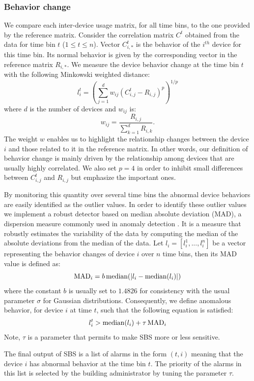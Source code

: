 \subsubsection{Behavior change}
We compare each inter-device usage matrix, for all time bins, to the one provided by the reference matrix.  
Consider the correlation matrix $C^t$ obtained from the data for time bin $t$ ($1 \leq t \leq n$).  
Vector $C^t_{i,*}$ is the behavior of the $i^{th}$ device for this time bin.
Its normal behavior is given by the corresponding vector in the reference matrix $R_{i,*}$.
We measure the device behavior change at the time bin $t$ with the following Minkowski weighted distance:
\[ l^t_{i} = \left(\sum_{j=1}^d  w_{ij}\left(C^t_{i,j} - R_{i,j}\right)^p\right)^{1/p} \]
where $d$ is the number of devices and $w_{ij}$ is:
\[ w_{ij} = \frac{R_{i,j}}{\sum_{k=1}^d R_{i,k}}. \]
The weight $w$ enables us to highlight the relationship changes between the device $i$ and those related to it in the reference matrix.
In other words, our definition of behavior change is mainly driven by the relationship among devices that are usually highly correlated.
We also set $p=4$ in order to inhibit small differences between $C^t_{i,j}$ and $R_{i,j}$ but emphasize the important ones.

By monitoring this quantity over several time bins the abnormal device behaviors are easily identified as the outlier values.
In order to identify these outlier values we implement a robust detector based on median absolute deviation (MAD), a dispersion measure commonly used in anomaly detection \cite{huber:wiley2009,chan:springer2005}.
It is a measure that robustly estimates the variability of the data by computing the median of the absolute deviations from the median of the data.
 Let $l_{i} = [l_i^1,...,l_i^n]$ be a vector representing the behavior changes of device $i$ over $n$ time bins, then its MAD value is defined as:
\[ \operatorname{MAD}_i = b \operatorname{median}(\lvert l_{i} - \operatorname{median}(l_{i})\rvert)\]
where the constant $b$ is usually set to $1.4826$ for consistency with the usual parameter $\sigma$ for Gaussian distributions.
Consequently, we define anomalous behavior, for device $i$ at time $t$, such that the following equation is satisfied:%
\[l^t_{i} > \operatorname{median}(l_{i}) + \tau  \operatorname{MAD}_i\]
Note, $\tau$ is a parameter that permits to make SBS more or less sensitive.

The final output of SBS is a list of alarms in the form $(t,i)$ meaning that the device $i$ has abnormal behavior at the time bin $t$.
The priority of the alarms in this list is selected by the building administrator by tuning the parameter $\tau$.

